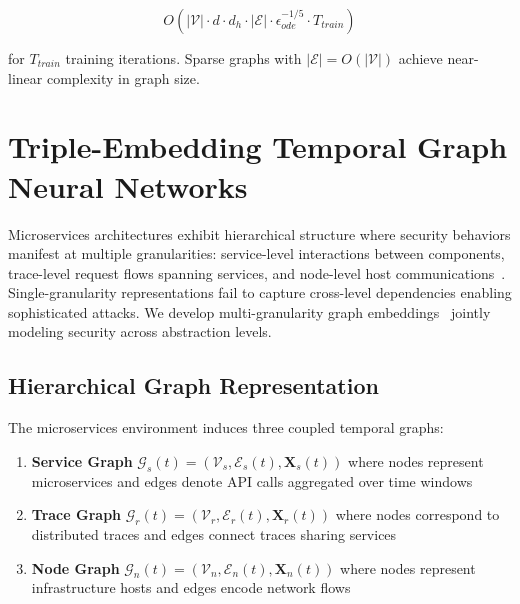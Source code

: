 \begin{equation}
O\left(|\mathcal{V}| \cdot d \cdot d_h \cdot |\mathcal{E}| \cdot \epsilon_{ode}^{-1/5} \cdot T_{train}\right)
\end{equation}

for $T_{train}$ training iterations. Sparse graphs with $|\mathcal{E}| = O(|\mathcal{V}|)$ achieve near-linear complexity in graph size.

\section{Triple-Embedding Temporal Graph Neural Networks}
\label{sec:models_tripleegnn}

Microservices architectures exhibit hierarchical structure where security behaviors manifest at multiple granularities: service-level interactions between components, trace-level request flows spanning services, and node-level host communications~\cite{hong2022multi}. Single-granularity representations fail to capture cross-level dependencies enabling sophisticated attacks. We develop multi-granularity graph embeddings~\cite{hu2020heterogeneous} jointly modeling security across abstraction levels.



\subsection{Hierarchical Graph Representation}

The microservices environment induces three coupled temporal graphs:

\begin{enumerate}[label=(\roman*), leftmargin=2em]
\item \textbf{Service Graph} $\mathcal{G}_s(t) = (\mathcal{V}_s, \mathcal{E}_s(t), \mathbf{X}_s(t))$ where nodes represent microservices and edges denote API calls aggregated over time windows

\item \textbf{Trace Graph} $\mathcal{G}_r(t) = (\mathcal{V}_r, \mathcal{E}_r(t), \mathbf{X}_r(t))$ where nodes correspond to distributed traces and edges connect traces sharing services

\item \textbf{Node Graph} $\mathcal{G}_n(t) = (\mathcal{V}_n, \mathcal{E}_n(t), \mathbf{X}_n(t))$ where nodes represent infrastructure hosts and edges encode network flows
\end{enumerate}

